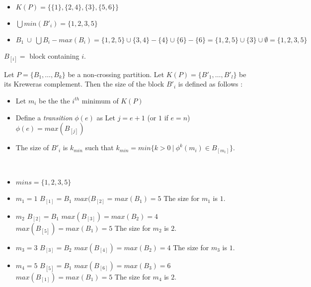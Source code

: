 \begin{example}[$P = \{\{1, 2, 5\}, \{3, 4\}, \{6\}\}$]
    ~\\
    \begin{itemize}
        \item $K (P) = \{\{1\},\{2, 4\}, \{3\}, \{5, 6\}\}$
        \item $\bigcup{min (B'_i)} = \{1, 2, 3, 5\}$
        \item $B_1\ \cup\ \bigcup{B_i - {max (B_i)}}
        = \{1, 2, 5\} \cup \{3, 4\} - \{4\} \cup \{6\} - \{6\}
        = \{1, 2, 5\} \cup \{3\} \cup \emptyset = \{1, 2, 3, 5\}$\\
    \end{itemize}
\end{example}

\begin{notation}
    $B_{[i]} = $ block containing $i$.
\end{notation}

\begin{prop}
    Let $P = \{B_1, \ldots, B_k\}$ be a non-crossing partition.
    Let $K (P) = \{B'_1, \ldots, B'_l\}$ be its Kreweras complement.
    Then the size of the block $B'_i$ is defined as follows :
    \begin{itemize}
        \item Let $m_i$ be the the $i^{th}$ minimum of $K (P)$
        \item Define a \emph{transition} $\phi (e)$ as 
            \subitem Let $j = e + 1$ (or $1$ if $e = n$)
            \subitem $\phi(e) = max (B_{[j]})$
        \item The size of $B'_i$ is $k_{min}$ such that
        $k_{min} = min \{k > 0\ |\ \phi^k (m_i) \in B_{[m_i]}\}$.\\
    \end{itemize}
\end{prop}

\begin{example}[$P = \{\{1, 2, 5\}, \{3, 4\}, \{6\}\}$]
    ~\\
    \begin{itemize}
        \item $mins = \{1, 2, 3, 5\}$
        \item $m_1 = 1$
            \subitem $B_{[1]} = B_1$
            \subitem $max (B_{[2]} = max (B_1) = 5$
            \subitem The size for $m_1$ is $1$.
        \item $m_2$
            \subitem $B_{[2]} = B_1$
            \subitem $max (B_{[3]}) = max (B_2) = 4$
            \subitem $max (B_{[5]}) = max (B_1) = 5$
            \subitem The size for $m_2$ is $2$.
        \item $m_3 = 3$
            \subitem $B_{[3]} = B_2$
            \subitem $max (B_{[4]}) = max (B_2) = 4$
            \subitem The size for $m_3$ is $1$.
        \item $m_4 = 5$
            \subitem $B_{[5]} = B_1$
            \subitem $max (B_{[6]}) = max (B_3) = 6$
            \subitem $max (B_{[1]}) = max (B_1) = 5$
            \subitem The size for $m_4$ is $2$.
    \end{itemize}
\end{example}

